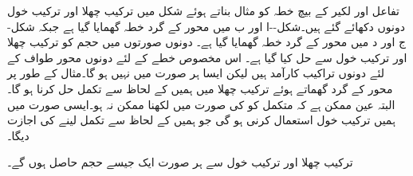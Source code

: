 \begin{figure}
\begin{subfigure}{0.45\textwidth}
\caption{}
\end{subfigure}
\caption{}
\label{شکل_تکمل_استعمال_چھلا_خول}
\end{figure}

تفاعل  اور لکیر  کے بیچ خطہ کو مثال بناتے ہوئے شکل  میں ترکیب چھلا اور ترکیب خول دونوں دکھائے گئے ہیں۔شکل--ا اور ب میں  محور کے گرد خطہ گھمایا گیا ہے جبکہ شکل-ج اور د میں  محور کے گرد خطہ گھمایا گیا ہے۔ دونوں صورتوں میں حجم کو ترکیب چھلا اور ترکیب خول سے حل کیا گیا ہے۔ اس مخصوص خطے کے لئے دونوں محور طواف کے لئے دونوں تراکیب کارآمد ہیں لیکن ایسا ہر صورت میں نہیں ہو گا۔مثال کے طور پر  محور کے گرد گھماتے ہوئے ترکیب چھلا میں ہمیں  کے لحاظ سے تکمل حل کرنا ہو گا۔البتہ عین ممکن ہے کہ متکمل کو  کی صورت میں لکھنا ممکن نہ ہو۔ایسی صورت میں ہمیں ترکیب خول استعمال کرنی ہو گی جو ہمیں  کے لحاظ سے تکمل لینے کی اجازت دیگا۔

ترکیب چھلا اور ترکیب خول سے ہر صورت ایک جیسے حجم حاصل ہوں گے۔


